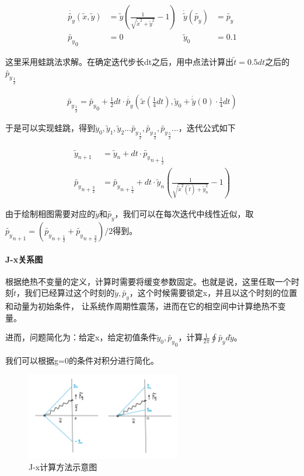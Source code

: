 \documentclass[10pt, a4paper]{article}
\newcommand{\wx}{\widetilde{x}}
\newcommand{\wy}{\widetilde{y}}
\newcommand{\wt}{\widetilde{t}}
\newcommand{\wpy}{\widetilde{p_y}}
\begin{document}
    \begin{align}
        \dot{\wpy}(\wx,\wy)&=\wy(\frac{1}{\sqrt{\wx^2+\wy^2}}-1) & \dot{\wy}(\wpy)&=\wpy\\
        \wpy_0&=0 & \wy_0&=0.1
    \end{align}

    这里采用蛙跳法求解。在确定迭代步长dt之后，用中点法计算出$\wt=0.5dt$之后的$\wpy_{\frac{1}{2}}$

    \begin{align}
        \wpy_{\frac{1}{2}}=\wpy_0+\frac{1}{2}dt\cdot\dot{\wpy}(\wx(\frac{1}4{dt}),\wy_0+\dot{\wy}(0)\cdot\frac{1}{4}dt)
    \end{align}

    于是可以实现蛙跳，得到$\wy_0,\wy_1,\wy_2...\wpy_\frac{1}{2},\wpy_\frac{3}{2},\wpy_\frac{5}{2}...$，迭代公式如下

    \begin{align}
        \wy_{n+1}&=\wy_n+dt\cdot\wpy_{n+\frac{1}{2}}\\
        \wpy_{n+\frac{3}{2}}&=\wpy_{n+\frac{1}{2}}+dt\cdot \wy_n(\frac{1}{\sqrt{\wx^2(\wt)+\wy_n^2}}-1)
    \end{align}

    由于绘制相图需要对应的$\wy$和$\wpy$，我们可以在每次迭代中线性近似，取$\wpy_{n+1}=(\wpy_{n+\frac{1}{2}}+ \wpy_{n+\frac{3}{2}})/2$得到。

    \paragraph{J-x关系图}

    根据绝热不变量的定义，计算时需要将缓变参数固定。也就是说，这里任取一个时刻$\wt$，我们已经算过这个时刻的$\wy,\wpy$，这个时候需要锁定x，并且以这个时刻的位置和动量为初始条件，
    让系统作周期性震荡，进而在它的相空间中计算绝热不变量。

    进而，问题简化为：给定x，给定初值条件$\wy_0,\wpy_0$，计算$\frac{1}{2\pi}\oint \wpy d\wy$。

    我们可以根据g=0的条件对积分进行简化。

    \begin{figure}[H]
        \centering
        \includegraphics[width=0.6\textwidth]{J-x计算方法示意图.png}
        \caption{J-x计算方法示意图}\label{J-x计算方法示意图}
    \end{figure}
\end{document}
